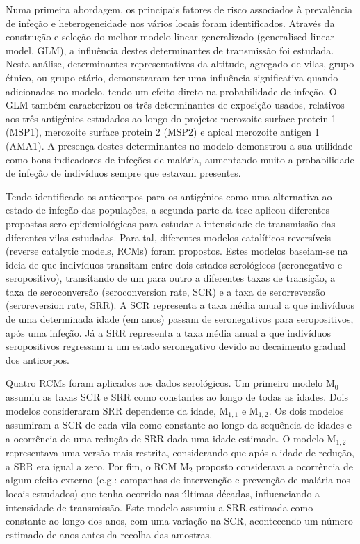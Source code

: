 \begin{resumo}
Numa primeira abordagem, os principais fatores de risco associados à prevalência de infeção e heterogeneidade nos vários locais foram identificados.
Através da construção e seleção do melhor modelo linear generalizado (generalised linear model, GLM), a influência destes determinantes de transmissão foi estudada.
Nesta análise, determinantes representativos da altitude, agregado de vilas, grupo étnico, ou grupo etário, demonstraram ter uma influência significativa quando adicionados no modelo, tendo um efeito direto na probabilidade de infeção.
O GLM também caracterizou os três determinantes de exposição usados, relativos aos três antigénios estudados ao longo do projeto: merozoite surface protein 1 (MSP1), merozoite surface protein 2 (MSP2) e apical merozoite antigen 1 (AMA1).
A presença destes determinantes no modelo demonstrou a sua utilidade como bons indicadores de infeções de malária, aumentando muito a probabilidade de infeção de indivíduos sempre que estavam presentes.

Tendo identificado os anticorpos para os antigénios como uma alternativa ao estado de infeção das populações, a segunda parte da tese aplicou diferentes propostas sero-epidemiológicas para estudar a intensidade de transmissão das diferentes vilas estudadas.
Para tal, diferentes modelos catalíticos reversíveis (reverse catalytic models, RCMs) foram propostos.
Estes modelos baseiam-se na ideia de que indivíduos transitam entre dois estados serológicos (seronegativo e seropositivo), transitando de um para outro a diferentes taxas de transição, a taxa de seroconversão (seroconversion rate, SCR) e a taxa de serorreversão (seroreversion rate, SRR).
A SCR representa a taxa média anual a que indivíduos de uma determinada idade (em anos) passam de seronegativos para seropositivos, após uma infeção.
Já a SRR representa a taxa média anual a que indivíduos seropositivos regressam a um estado seronegativo devido ao decaimento gradual dos anticorpos.

Quatro RCMs foram aplicados aos dados serológicos.
Um primeiro modelo M$_{0}$ assumiu as taxas SCR e SRR como constantes ao longo de todas as idades.
Dois modelos consideraram SRR dependente da idade, M$_{1,1}$ e M$_{1,2}$.
Os dois modelos assumiram a SCR de cada vila como constante ao longo da sequência de idades e a ocorrência de uma redução de SRR dada uma idade estimada.
O modelo M$_{1,2}$ representava uma versão mais restrita, considerando que após a idade de redução, a SRR era igual a zero.
Por fim, o RCM M$_{2}$ proposto considerava a ocorrência de algum efeito externo (e.g.: campanhas de intervenção e prevenção de malária nos locais estudados) que tenha ocorrido nas últimas décadas, influenciando a intensidade de transmissão.
Este modelo assumiu a SRR estimada como constante ao longo dos anos, com uma variação na SCR, acontecendo um número estimado de anos antes da recolha das amostras.


\end{resumo}
